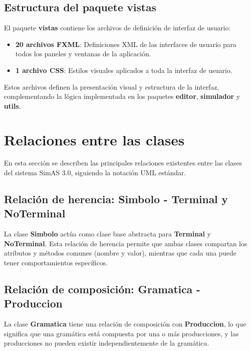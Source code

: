 \subsection{Estructura del paquete vistas}

El paquete \textbf{vistas} contiene los archivos de definición de interfaz de usuario:

\begin{itemize}
    \item \textbf{20 archivos FXML}: Definiciones XML de las interfaces de usuario para todos los paneles y ventanas de la aplicación.
    \item \textbf{1 archivo CSS}: Estilos visuales aplicados a toda la interfaz de usuario.
\end{itemize}

Estos archivos definen la presentación visual y estructura de la interfaz, complementando la lógica implementada en los paquetes \textbf{editor}, \textbf{simulador} y \textbf{utils}.

\section{Relaciones entre las clases}

En esta sección se describen las principales relaciones existentes entre las clases del sistema SimAS 3.0, siguiendo la notación UML estándar.

\subsection{Relación de herencia: Simbolo - Terminal y NoTerminal}

La clase \textbf{Simbolo} actúa como clase base abstracta para \textbf{Terminal} y \textbf{NoTerminal}. Esta relación de herencia permite que ambas clases compartan los atributos y métodos comunes (nombre y valor), mientras que cada una puede tener comportamientos específicos.

\subsection{Relación de composición: Gramatica - Produccion}

La clase \textbf{Gramatica} tiene una relación de composición con \textbf{Produccion}, lo que significa que una gramática está compuesta por una o más producciones, y las producciones no pueden existir independientemente de la gramática.


